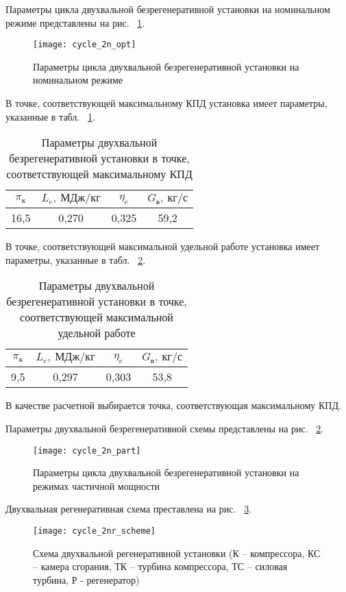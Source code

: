 Параметры цикла двухвальной безрегенеративной установки на номинальном режиме представлены на рис. ~\ref{img:cycle_2n_opt}.

\begin{figure}[H]
    \centering
    \texttt{[image: cycle\_2n\_opt]}
    \caption{Параметры цикла двухвальной безрегенеративной установки на номинальном режиме}
    \label{img:cycle_2n_opt}
\end{figure}

В точке, соответствующей максимальному КПД установка имеет параметры, указанные в табл. ~\ref{tab:cycle_2n_max_eta}.

\begin{longtable}{|c|c|c|c|}
	\caption{Параметры двухвальной безрегенеративной установки в точке, соответствующей максимальному КПД} 
	\label{tab:cycle_2n_max_eta}
	\hline
	\textbf{$\pi_к$} & \textbf{$L_e, \ МДж/кг$} & \textbf{$\eta_e$} & \textbf{$G_в, \ кг/с$} \\ \hline
	16,5 & 0,270 & 0,325 & 59,2 \\ \hline
\end{longtable}


В точке, соответствующей максимальной удельной работе установка имеет параметры, указанные в табл. ~\ref{tab:cycle_2n_max_labour}.
\begin{longtable}{|c|c|c|c|}
	\caption{Параметры двухвальной безрегенеративной установки в точке, соответствующей максимальной удельной работе} 
	\label{tab:cycle_2n_max_labour}
	\hline
	\textbf{$\pi_к$} & \textbf{$L_e, \ МДж/кг$} & \textbf{$\eta_e$} & \textbf{$G_в, \ кг/с$} \\ \hline
	9,5 & 0,297 & 0,303 & 53,8 \\ \hline
\end{longtable}

В качестве расчетной выбирается точка, соответствующая максимальному КПД.

Параметры двухвальной безрегенеративной схемы представлены на рис. ~\ref{img:cycle_2n_part}.

\begin{figure}[H]
    \centering
    \texttt{[image: cycle\_2n\_part]}
    \caption{Параметры цикла двухвальной безрегенеративной установки на режимах частичной мощности}
    \label{img:cycle_2n_part}
\end{figure}

Двухвальная регенеративная схема преставлена на рис. ~\ref{img:cycle_2nr_scheme}.

\begin{figure}[H]
    \centering
    \texttt{[image: cycle\_2nr\_scheme]}
    \caption{Схема двухвальной регенеративной установки (К – компрессора, КС – камера сгорания, ТК – турбина компрессора, ТС – силовая турбина, Р - регенератор)}
    \label{img:cycle_2nr_scheme}
\end{figure}

